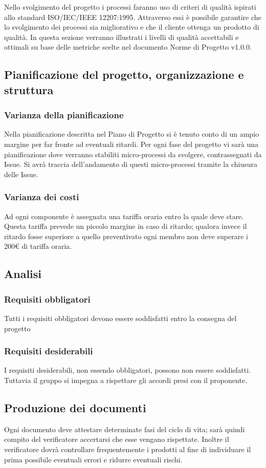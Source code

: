 \documentclass[../piano_di_qualifica.tex]{subfiles}
\begin{document}
Nello svolgimento del progetto i processi faranno uso di criteri di qualità ispirati allo standard ISO/IEC/IEEE 12207:1995. Attraverso essi è possibile garantire che lo svolgimento dei processi sia migliorativo e che il cliente ottenga un prodotto di qualità. In questa sezione verranno illustrati i livelli di qualità accettabili e ottimali su base delle metriche scelte nel documento Norme di Progetto v1.0.0.



\subsection{Pianificazione del progetto, organizzazione e struttura}%
\label{sub:pianif_org_str}
\subsubsection{Varianza della pianificazione}
Nella pianificazione descritta nel Piano di Progetto si è tenuto conto di un ampio margine per far fronte ad eventuali ritardi. Per ogni fase del progetto vi sarà una pianificazione dove verranno stabiliti micro-processi da svolgere, contrassegnati da Issue. Si avrà traccia dell’andamento di questi micro-processi tramite la chiusura delle Issue. 

\subsubsection{Varianza dei costi}
Ad ogni componente è assegnata una tariffa oraria entro la quale deve stare. Questa tariffa prevede un piccolo margine in caso di ritardo; qualora invece il ritardo fosse superiore a quello preventivato ogni membro non deve superare i 200€ di tariffa oraria.

\subsection{Analisi}%
\label{sub:analisi_pq}
\subsubsection{Requisiti obbligatori}
Tutti i requisiti obbligatori devono essere soddisfatti entro la consegna del progetto

\subsubsection{Requisiti desiderabili}
I requisiti desiderabili, non essendo obbligatori, possono non essere soddisfatti. Tuttavia il gruppo si impegna a rispettare gli accordi presi con il proponente. 

\subsection{Produzione dei documenti}
\label{sub:prod_doc}
Ogni documento deve attestare determinate fasi del ciclo di vita; sarà quindi compito del verificatore accertarsi che esse vengano rispettate. Inoltre il verificatore dovrà controllare frequentemente i prodotti al fine di individuare il prima possibile eventuali errori e ridurre eventuali rischi. 
\end{document}
